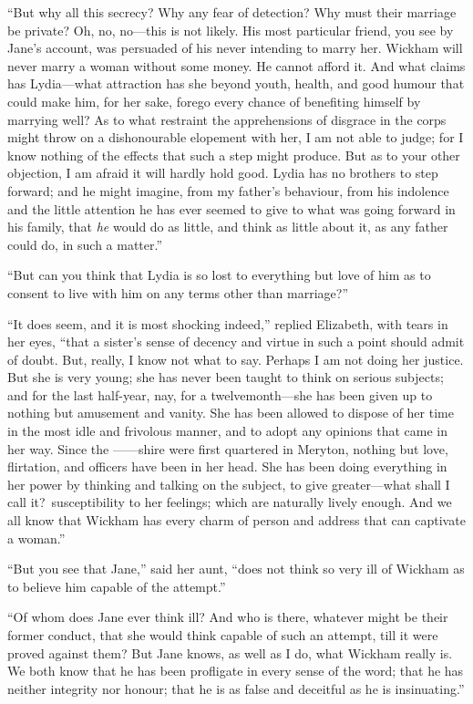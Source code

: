 \documentclass[12pt,english,oneside]{book}
\begin{document}
{}``But why all this secrecy? Why any fear of detection? Why must
their marriage be private? Oh, no, no\mbox{---}this is not likely.
His most particular friend, you see by Jane's account, was persuaded
of his never intending to marry her. Wickham will never marry a woman
without some money. He cannot afford it. And what claims has Lydia\mbox{---}what
attraction has she beyond youth, health, and good humour that could
make him, for her sake, forego every chance of benefiting himself
by marrying well? As to what restraint the apprehensions of disgrace
in the corps might throw on a dishonourable elopement with her, I
am not able to judge; for I know nothing of the effects that such
a step might produce. But as to your other objection, I am afraid
it will hardly hold good. Lydia has no brothers to step forward; and
he might imagine, from my father's behaviour, from his indolence and
the little attention he has ever seemed to give to what was going
forward in his family, that \textit{he} would do as little, and think
as little about it, as any father could do, in such a matter.''

{}``But can you think that Lydia is so lost to everything but love
of him as to consent to live with him on any terms other than marriage?''\ 

{}``It does seem, and it is most shocking indeed,'' replied Elizabeth,
with tears in her eyes, {}``that a sister's sense of decency and
virtue in such a point should admit of doubt. But, really, I know
not what to say. Perhaps I am not doing her justice. But she is very
young; she has never been taught to think on serious subjects; and
for the last half-year, nay, for a twelvemonth\mbox{---}she has been
given up to nothing but amusement and vanity. She has been allowed
to dispose of her time in the most idle and frivolous manner, and
to adopt any opinions that came in her way. Since the \mbox{------}shire
were first quartered in Meryton, nothing but love, flirtation, and
officers have been in her head. She has been doing everything in her
power by thinking and talking on the subject, to give greater\mbox{---}what
shall I call it?\ susceptibility to her feelings; which are naturally
lively enough. And we all know that Wickham has every charm of person
and address that can captivate a woman.''

{}``But you see that Jane,'' said her aunt, {}``does not think
so very ill of Wickham as to believe him capable of the attempt.''

{}``Of whom does Jane ever think ill? And who is there, whatever
might be their former conduct, that she would think capable of such
an attempt, till it were proved against them? But Jane knows, as well
as I do, what Wickham really is. We both know that he has been profligate
in every sense of the word; that he has neither integrity nor honour;
that he is as false and deceitful as he is insinuating.''
\end{document}
